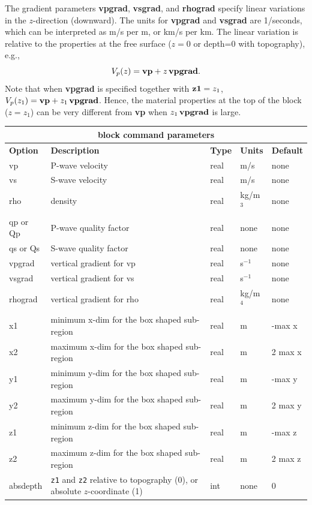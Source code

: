 \documentclass[11pt]{report}
\begin{document}
The gradient parameters {\bf vpgrad}, {\bf vsgrad}, and {\bf rhograd} specify linear variations in the
$z$-direction (downward). The units for {\bf vpgrad} and {\bf vsgrad} are 1/seconds, which
can be interpreted as m/s per m, or km/s per km. The linear variation is relative to the properties at
the free surface ($z=0$ or depth=0 with topography), e.g.,
\[
V_p(z) = {\bf vp} + z \, {\bf vpgrad}.
\]
Note that when {\bf vpgrad} is specified together with ${\bf z1}=z_1$, $V_p(z_1) = {\bf vp} + z_1\,
{\bf vpgrad}$. Hence, the material properties at the top of the block ($z=z_1$) can be very
different from {\bf vp} when $z_1\, {\bf vpgrad}$ is large.
\begin{center}
\begin{tabular}{|l|p{8cm}|l|l|l|} \hline
\multicolumn{5}{|c|}{\bf block command parameters}\\ \hline
{\bf Option} & {\bf Description}          & {\bf Type} & {\bf Units} & {\bf Default} \\ \hline 
\hline
vp          & P-wave velocity           & real     & m/s      & none \\ \hline
vs          & S-wave velocity           & real     & m/s      & none \\ \hline
rho         & density                   & real     & kg/m$^3$ & none \\ \hline
qp or Qp    & P-wave quality factor     & real     & none     & none \\ \hline
qs or Qs    & S-wave quality factor     & real     & none     & none \\ \hline
vpgrad      & vertical gradient for vp  & real     & s$^{-1}$  & none \\ \hline
vsgrad      & vertical gradient for vs  & real     & s$^{-1}$  & none \\ \hline
rhograd     & vertical gradient for rho & real     & kg/m$^4$  & none \\ \hline
x1          & minimum x-dim for the box shaped sub-region & real & m & -max x \\ \hline
x2          & maximum x-dim for the box shaped sub-region & real & m & 2 max x \\ \hline
\hline
y1          & minimum y-dim for the box shaped sub-region & real & m & -max y \\ \hline
y2          & maximum y-dim for the box shaped sub-region & real & m & 2 max y \\ \hline
\hline
z1          & minimum z-dim for the box shaped sub-region & real & m & -max z \\ \hline
z2          & maximum z-dim for the box shaped sub-region & real & m & 2 max z \\ \hline
\hline
absdepth    & {\tt z1} and {\tt z2} relative to topography (0), or absolute $z$-coordinate (1) & int
& none & 0 \\ \hline 
\end{tabular}
\end{center}
\end{document}
